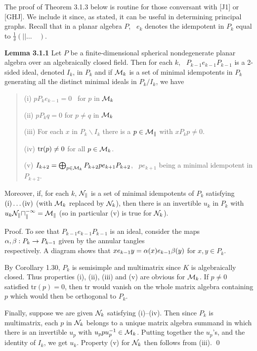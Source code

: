
\bs\bs{}

\medskip{}

The proof of Theorem 3.1.3 below is routine for those conversant
with [J1] or [GHJ]. We include it since, as stated, it can
be useful in determining principal graphs. Recall that in a planar
algebra $P$, \ $e_k$ denotes the idempotent in $P_k$ equal to
$\frac{1}{\delta}(| |\dots \quad )$.

{\bf Lemma 3.1.1} Let $P$ be a finite-dimensional
spherical nondegenerate planar algebra over an algebraically closed
field. Then for each  $k$, \
$P_{k-1}e_{k-1}P_{k-1}$ is a 2-sided ideal, denoted $I_k$, in $P_k$
and if ${\cal M}_k$ is a set of minimal idempotents in $P_k$
generating all the distinct minimal ideals in $P_k/I_k$, we have
\begin{verse}
(i)   $pP_ke_{k-1}=0$ \ for $p$ in ${\cal M}_k$

(ii)  $pP_kq=0$ for $p\neq q$ in ${\cal M}_k$

(iii) For each $x$ in $P_k\backslash I_k$ there is a
$p\in\cal M_k$ with $xP_kp\neq 0$.

(iv) ${\bf\rm{tr}}(p)\neq 0$ for all $p\in {\cal M}_k$.

(v) $I_{k+2}=\bigoplus_{p\in{\cal M}_k}
P_{k+2}pe_{k+1}P_{k+2}$, \ $pe_{k+1}$ being a minimal idempotent in
$P_{k+2}$.
\end{verse}
Moreover, if, for each $k$, $\cal N_k$ is a set of minimal
idempotents of $P_k$ satisfying ${\bf\rm{(i)}}\dots{\bf\rm{(iv)}}$ (with
${\cal M}_k$ replaced by ${\cal N}_k$), then there is an invertible
$u_k$ in $P_k$ with $u_k\cal N_ku^{-1}_k={\cal M}_k$ (so in
particular (v) is true for ${\cal N}_k$).

\bigskip
{\sc Proof.} To see that $P_{k-1}e_{k-1}P_{k-1}$ is an
ideal, consider the maps $\alpha,\beta: P_k\to P_{k-1}$ given by the
annular tangles
\[
	
\]
\ni respectively. A  diagram shows that
$xe_{k-1}y=\alpha(x)e_{k-1}\beta(y)$ for $x,y\in P_k$.

By Corollary 1.30, $P_k$ is semisimple and multimatrix since $K$ is
algebraically closed. Thus properties (i), (ii), (iii) and (v) are
obvious for ${\cal M}_k$. If $p\neq 0$ satisfied tr$(p)=0$, then tr
would vanish on the whole matrix algebra containing $p$ which
would then be orthogonal to $P_k$.

Finally, suppose we are given ${\cal N}_k$ satisfying (i)--(iv).
Then since $P_k$ is multimatrix, each $p$ in  ${\cal N}_k$ belongs to
a unique matrix algebra summand in which there is an invertible
$u_p$ with $u_ppu_p^{-1}\in{\cal M}_k$. Putting together the
$u_p$'s, and the identity of $I_k$, we get $u_k$. Property (v) for
${\cal N}_k$ then follows from (iii). \qed




